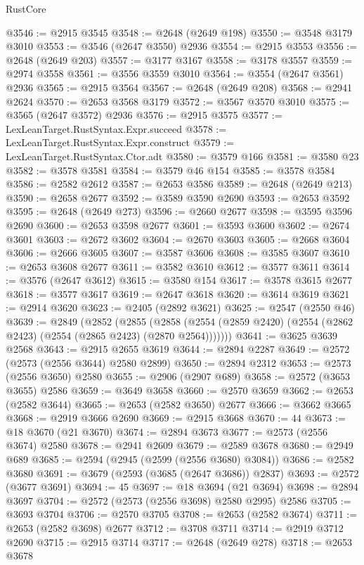 \begin{lexlean}{RustCore}
\begin{coremodule}
@3546 := @2915 @3545
@3548 := @2648 (@2649 @198)
@3550 := @3548 @3179 @3010
@3553 := @3546 (@2647 @3550) @2936
@3554 := @2915 @3553
@3556 := @2648 (@2649 @203)
@3557 := @3177 @3167
@3558 := @3178 @3557
@3559 := @2974 @3558
@3561 := @3556 @3559 @3010
@3564 := @3554 (@2647 @3561) @2936
@3565 := @2915 @3564
@3567 := @2648 (@2649 @208)
@3568 := @2941 @2624
@3570 := @2653 @3568 @3179
@3572 := @3567 @3570 @3010
@3575 := @3565 (@2647 @3572) @2936
@3576 := @2915 @3575
@3577 := LexLeanTarget.RustSyntax.Expr.succeed
@3578 := LexLeanTarget.RustSyntax.Expr.construct
@3579 := LexLeanTarget.RustSyntax.Ctor.adt
@3580 := @3579 @166
@3581 := @3580 @23
@3582 := @3578 @3581
@3584 := @3579 @46 @154
@3585 := @3578 @3584
@3586 := @2582 @2612
@3587 := @2653 @3586
@3589 := @2648 (@2649 @213)
@3590 := @2658 @2677
@3592 := @3589 @3590 @2690
@3593 := @2653 @3592
@3595 := @2648 (@2649 @273)
@3596 := @2660 @2677
@3598 := @3595 @3596 @2690
@3600 := @2653 @3598 @2677
@3601 := @3593 @3600
@3602 := @2674 @3601
@3603 := @2672 @3602
@3604 := @2670 @3603
@3605 := @2668 @3604
@3606 := @2666 @3605
@3607 := @3587 @3606
@3608 := @3585 @3607
@3610 := @2653 @3608 @2677
@3611 := @3582 @3610
@3612 := @3577 @3611
@3614 := @3576 (@2647 @3612)
@3615 := @3580 @154
@3617 := @3578 @3615 @2677
@3618 := @3577 @3617
@3619 := @2647 @3618
@3620 := @3614 @3619
@3621 := @2914 @3620
@3623 := @2405 (@2892 @3621)
@3625 := @2547 (@2550 @46)
@3639 := @2849
    (@2852
      (@2855
        (@2858 (@2554 (@2859 @2420) (@2554 (@2862 @2423) (@2554 (@2865 @2423) (@2870 @2564)))))))
@3641 := @3625 @3639 @2568
@3643 := @2915 @2655 @3619
@3644 := @2894 @2287
@3649 := @2572 (@2573 (@2556 @3644) @2580 @2899)
@3650 := @2894 @2312
@3653 := @2573 (@2556 @3650) @2580
@3655 := @2906 (@2907 @689)
@3658 := @2572 (@3653 @3655) @2586
@3659 := @3649 @3658
@3660 := @2570 @3659
@3662 := @2653 (@2582 @3644)
@3665 := @2653 (@2582 @3650) @2677
@3666 := @3662 @3665
@3668 := @2919 @3666 @2690
@3669 := @2915 @3668
@3670 := 44
@3673 := @18 @3670 (@21 @3670)
@3674 := @2894 @3673
@3677 := @2573 (@2556 @3674) @2580
@3678 := @2941 @2609
@3679 := @2589 @3678
@3680 := @2949 @689
@3685 := @2594 (@2945 (@2599 (@2556 @3680) @3084))
@3686 := @2582 @3680
@3691 := @3679 (@2593 (@3685 (@2647 @3686)) @2837)
@3693 := @2572 (@3677 @3691)
@3694 := 45
@3697 := @18 @3694 (@21 @3694)
@3698 := @2894 @3697
@3704 := @2572 (@2573 (@2556 @3698) @2580 @2995) @2586
@3705 := @3693 @3704
@3706 := @2570 @3705
@3708 := @2653 (@2582 @3674)
@3711 := @2653 (@2582 @3698) @2677
@3712 := @3708 @3711
@3714 := @2919 @3712 @2690
@3715 := @2915 @3714
@3717 := @2648 (@2649 @278)
@3718 := @2653 @3678

\end{coremodule}
\end{lexlean}
